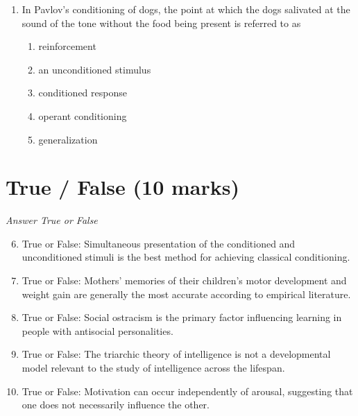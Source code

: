 \documentclass[12pt]{article}
\begin{document}
\begin{enumerate}[label=\arabic*.]
\begin{enumerate}[label=(\alph*)]
    \item The school must invest in more modern educational technology.
    \item Students who are not meeting competencies must be placed in lower grade levels.
    \item Students must be given more time to develop competencies.
    \item The school must hire more teachers to reduce class size.
    \item Parents of students not meeting competencies must be contacted for meetings.
\end{enumerate}
\item In Pavlov's conditioning of dogs, the point at which the dogs salivated at the sound of the tone without the food being present is referred to as
\begin{enumerate}[label=(\alph*)]
    \item reinforcement
    \item an unconditioned stimulus
    \item conditioned response
    \item operant conditioning
    \item generalization
\end{enumerate}
\end{enumerate}

\section*{True / False (10 marks)}
\textit{Answer True or False}
\begin{enumerate}[label=\arabic*.]
\setcounter{enumi}{5}
\item True or False: Simultaneous presentation of the conditioned and unconditioned stimuli is the best method for achieving classical conditioning.
\item True or False: Mothers' memories of their children's motor development and weight gain are generally the most accurate according to empirical literature.
\item True or False: Social ostracism is the primary factor influencing learning in people with antisocial personalities.
\item True or False: The triarchic theory of intelligence is not a developmental model relevant to the study of intelligence across the lifespan.
\item True or False: Motivation can occur independently of arousal, suggesting that one does not necessarily influence the other.
\end{enumerate}
\end{document}
